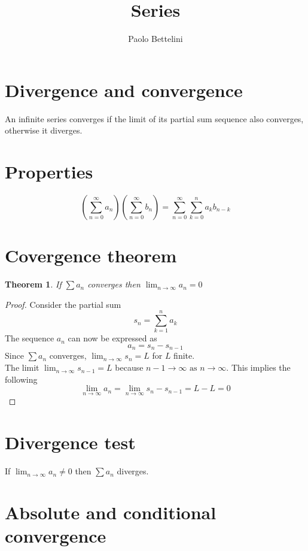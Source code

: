 \documentclass[a4paper]{article}
\title{Series}
\author{Paolo Bettelini}
\date{}
\begin{document}
\maketitle
\tableofcontents
\pagebreak

\section{Divergence and convergence}

An infinite series converges if the limit
of its partial sum sequence also converges,
otherwise it diverges.

\section{Properties}

\[
    \left(
        \sum_{n=0}^\infty a_n
    \right)
    \left(
        \sum_{n=0}^\infty b_n
    \right)
    =
    \sum_{n=0}^\infty \sum_{k=0}^n a_k b_{n-k}
\]

\section{Covergence theorem}

\newtheorem*{theorem1}{Theorem}

\begin{theorem1}
    If \(\sum a_n\) converges then \(\lim_{n\to\infty}a_n=0\)
\end{theorem1}
\begin{proof}
    Consider the partial sum
    \[
        s_n = \sum_{k=1}^{n}a_k
    \]
    The sequence \(a_n\) can now be expressed as
    \[
        a_n = s_n - s_{n-1}
    \]
    Since \(\sum a_n\) converges, \(\lim_{n\to\infty}s_n=L\) for \(L\) finite. \\
    The limit \(\lim_{n\to\infty}s_{n-1}=L\) because \(n-1 \to \infty \text{ as } n \to \infty\).
    This implies the following
    \[
        \lim_{n \to \infty} a_n
        = \lim_{n \to \infty} s_n - s_{n-1} = L - L = 0
    \]
\end{proof}

\section{Divergence test}

If \(\lim_{n \to \infty} a_n \neq 0\) then \(\sum a_n\) diverges.

\section{Absolute and conditional convergence}
\end{document}
